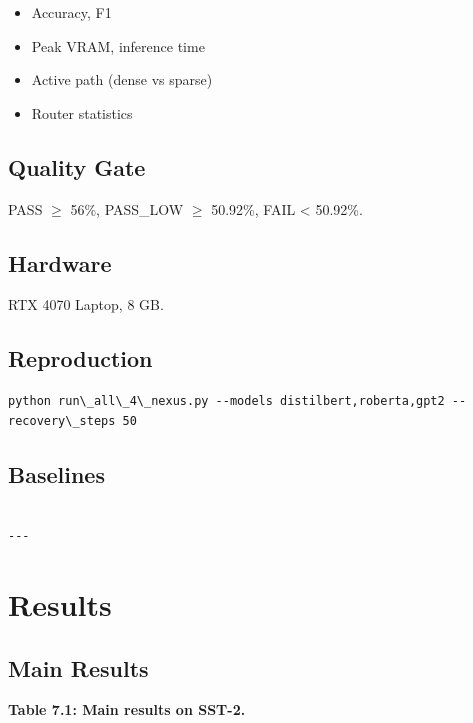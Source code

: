 \begin{itemize}
\item Accuracy, F1
\item Peak VRAM, inference time
\item Active path (dense vs sparse)
\item Router statistics

\end{itemize}
\subsection{Quality Gate}

PASS $\ge$ 56\%, PASS\_LOW $\ge$ 50.92\%, FAIL \textless{} 50.92\%.

\subsection{Hardware}

RTX 4070 Laptop, 8 GB.

\subsection{Reproduction}

\begin{lstlisting}
python run\_all\_4\_nexus.py --models distilbert,roberta,gpt2 --recovery\_steps 50
\end{lstlisting}

\subsection{Baselines}

\begin{lstlisting}

---
\end{lstlisting}

\section{Results}

\subsection{Main Results}

\textbf{Table 7.1: Main results on SST-2.}

